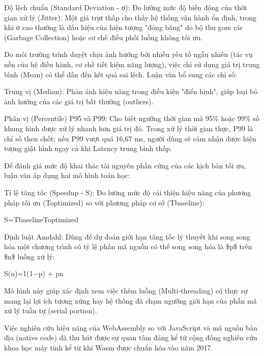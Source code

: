 Độ lệch chuẩn (Standard Deviation - σ): Đo lường mức độ biến động của thời gian xử lý (Jitter). Một giá trịσ thấp cho thấy hệ thống vận hành ổn định, trong khi σ cao thường là dấu hiệu của hiện tượng "đóng băng" do bộ thu gom rác (Garbage Collection) hoặc cơ chế điều phối luồng không tối ưu.



Do môi trường trình duyệt chịu ảnh hưởng bởi nhiều yếu tố ngẫu nhiên (tác vụ nền của hệ điều hành, cơ chế tiết kiệm năng lượng), việc chỉ sử dụng giá trị trung bình (Mean) có thể dẫn đến kết quả sai lệch. Luận văn bổ sung các chỉ số:


Trung vị (Median): Phản ánh hiệu năng trong điều kiện "điển hình", giúp loại bỏ ảnh hưởng của các giá trị bất thường (outliers).


Phân vị (Percentile) P95 và P99: Cho biết ngưỡng thời gian mà 95\% hoặc 99\% số khung hình được xử lý nhanh hơn giá trị đó. Trong xử lý thời gian thực, P99 là chỉ số then chốt; nếu P99 vượt quá 16,67 ms, người dùng sẽ cảm nhận được hiện tượng giật hình ngay cả khi Latency trung bình thấp.



Để đánh giá mức độ khai thác tài nguyên phần cứng của các kịch bản tối ưu, luận văn áp dụng hai mô hình toán học:


Tỉ lệ tăng tốc (Speedup - S): Đo lường mức độ cải thiện hiệu năng của phương pháp tối ưu (Toptimized) so với phương pháp cơ sở (Tbaseline):


S=TbaselineToptimized


Định luật Amdahl: Dùng để dự đoán giới hạn tăng tốc lý thuyết khi song song hóa một chương trình có tỷ lệ phần mã nguồn có thể song song hóa là \$p\$ trên \$n\$ luồng xử lý:


S(n)=1(1−p) + pn


Mô hình này giúp xác định xem việc thêm luồng (Multi-threading) có thực sự mang lại lợi ích tương xứng hay hệ thống đã chạm ngưỡng giới hạn của phần mã xử lý tuần tự (serial portion).



Việc nghiên cứu hiệu năng của WebAssembly so với JavaScript và mã nguồn bản địa (native code) đã thu hút được sự quan tâm đáng kể từ cộng đồng nghiên cứu khoa học máy tính kể từ khi Wasm được chuẩn hóa vào năm 2017.



